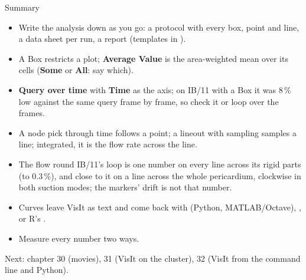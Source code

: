 \documentclass[aspectratio=169,11pt]{beamer}
\newcommand{\gui}[1]{\textsf{\textbf{#1}}}
\begin{document}
\begin{frame}{Summary}
\label{fr:summary}
\footnotesize
\begin{itemize}
  \item Write the analysis down as you go: a protocol with every box, point and line, a data sheet per run, a report (templates in ).
  \item A Box restricts a plot; \gui{Average Value} is the area-weighted mean over its cells (\gui{Some} or \gui{All}: say which).
  \item \gui{Query over time} with \gui{Time} as the axis; on IB/11 with a Box it was 8\,\% low against the same query frame by frame, so check it or loop over the frames.
  \item A node pick through time follows a point; a lineout with sampling samples a line; integrated, it is the flow rate across the line.
  \item The flow round IB/11's loop is one number on every line across its rigid parts (to 0.3\,\%), and close to it on a line across the whole pericardium, clockwise in both suction modes; the markers' drift is not that number.
  \item Curves leave VisIt as  text and come back with  (Python, MATLAB/Octave), ,  or R's .
  \item Measure every number two ways.
\end{itemize}
\vspace{1mm}
Next: chapter 30 (movies), 31 (VisIt on the cluster), 32 (VisIt from the command line and Python).
\end{frame}
\end{document}
